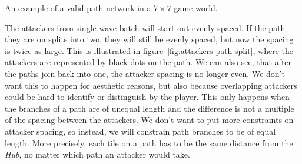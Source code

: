 \begin{center}
    \captionsetup{type=figure}
    \caption{An example of a valid path network in a $7 \times 7$ game world.}
    \label{fig:valid-path-example}
\end{center}

The attackers from single wave batch will start out evenly spaced.
If the path they are on splits into two, they will still be evenly spaced, but now the spacing is twice as large.
This is illustrated in figure~\ref{fig:attackers-path-split}, where the attackers are represented by black dots on the path.
We can also see, that after the paths join back into one, the attacker spacing is no longer even.
We don't want this to happen for aesthetic reasons, but also because overlapping attackers could be hard to identify or distinguish by the player.
This only happens when the branches of a path are of unequal length and the difference is not a multiple of the spacing between the attackers.
We don't want to put more constraints on attacker spacing, so instead, we will constrain path branches to be of equal length.
More precisely, each tile on a path has to be the same distance from the \emph{Hub}, no matter which path an attacker would take.

